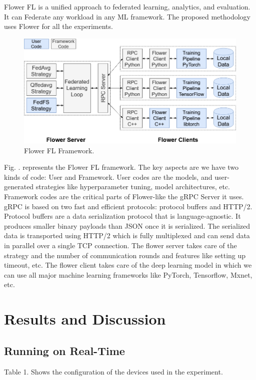 \documentclass[conference]{IEEEtran}
\begin{document}
Flower FL \cite{beutel2020flower} is a unified approach to federated learning, analytics, and evaluation. It can Federate any workload in any ML framework. The proposed methodology uses Flower for all the experiments.
\begin{figure}[htp]
        \centering
        \includegraphics[scale=.25]{Images/flower-core-framework-architecture.png}
        \caption{Flower FL Framework.}
        \label{fig:arch}
    \end{figure}
Fig. \pageref{fig:arch}. represents the Flower FL framework. The key aspects are we have two kinds of code: User and Framework. User codes are the models, and user-generated strategies like hyperparameter tuning, model architectures, etc. Framework codes are the critical parts of Flower-like the gRPC Server it uses. gRPC is based on two fast and efficient protocols: protocol buffers and HTTP/2. Protocol buffers are a data serialization protocol that is language-agnostic. It produces smaller binary payloads than JSON once it is serialized. The serialized data is transported using HTTP/2 which is fully multiplexed and can send data in parallel over a single TCP connection. The flower server takes care of the strategy and the number of communication rounds and features like setting up timeout, etc. The flower client takes care of the deep learning model in which we can use all major machine learning frameworks like PyTorch, Tensorflow, Mxnet, etc.


\section{Results and Discussion}
\subsection{Running on Real-Time}
Table 1. Shows the configuration of the devices used in the experiment. 
\end{document}
